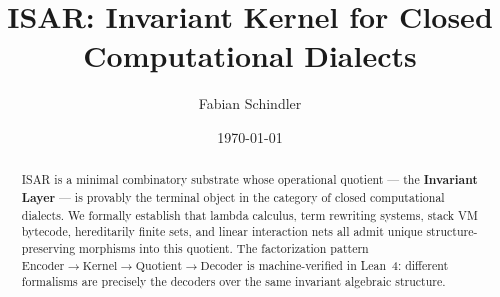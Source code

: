 \documentclass{report}
\title{ISAR: Invariant Kernel for Closed Computational Dialects}
\author{Fabian Schindler}
\date{\today}
\begin{document}
\maketitle

\begin{abstract}
ISAR is a minimal combinatory substrate whose operational quotient --- the \textbf{Invariant Layer} --- is provably the terminal object in the category of closed computational dialects. We formally establish that lambda calculus, term rewriting systems, stack VM bytecode, hereditarily finite sets, and linear interaction nets all admit unique structure-preserving morphisms into this quotient. The factorization pattern $\text{Encoder} \to \text{Kernel} \to \text{Quotient} \to \text{Decoder}$ is machine-verified in Lean~4: different formalisms are precisely the decoders over the same invariant algebraic structure.
\end{abstract}


\end{document}
